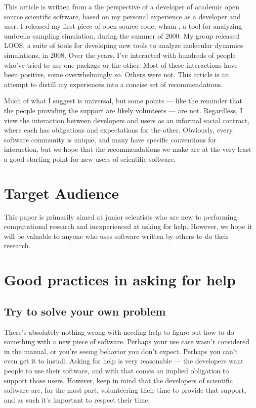 \documentclass[9pt,training,pubversion]{livecoms}
\begin{document}
This article is written from a the perspective of a developer of academic
open source scientific software, based on my personal experience as a developer
and user. I released my first piece of open source code, wham \cite{WHAM}, a
tool for analyzing umbrella sampling simulation,  during the summer of 2000.  My
group released LOOS\cite{Grossfield-2009, LOOS-JCC}, a suite of tools for
developing new tools to analyze molecular dynamics simulations, in 2008. Over
the years, I've interacted with hundreds of people who've tried to use one
package or the other. Most of these interactions have been positive, some
overwhelmingly so. Others were not. This article is an attempt to distill my
experiences into a concise set of recommendations.

Much of what I suggest is universal, but some points --- like the
reminder that the people providing the support are likely volunteers --- are
not.  Regardless, I view the interaction between developers and users as an
informal social contract, where each has obligations and expectations for the
other. Obviously, every software community is unique, and many have specific
conventions for interaction, but we hope that the recommendations we make are at
the very least a good starting point for new users of scientific software.



\section{Target Audience}

This paper is primarily aimed at junior scientists who are new to performing
computational research and inexperienced at asking for help. However, we hope it
will be valuable to anyone who uses software written by others to do their
research.

\section{Good practices in asking for help}

\subsection{Try to solve your own problem}
\label{ss:yourself}

There's absolutely nothing wrong with needing help to figure out how to do
something with a new piece of software. Perhaps your use case wasn't considered
in the manual, or you're seeing behavior you don't expect. Perhaps you can't
even get it to install. Asking for help is very reasonable --- the developers
want people to use their software, and with that comes an implied obligation to
support those users. However, keep in mind that the developers of scientific
software are, for the most part, volunteering their time to provide that
support, and as such it's important to respect their time.
\end{document}
